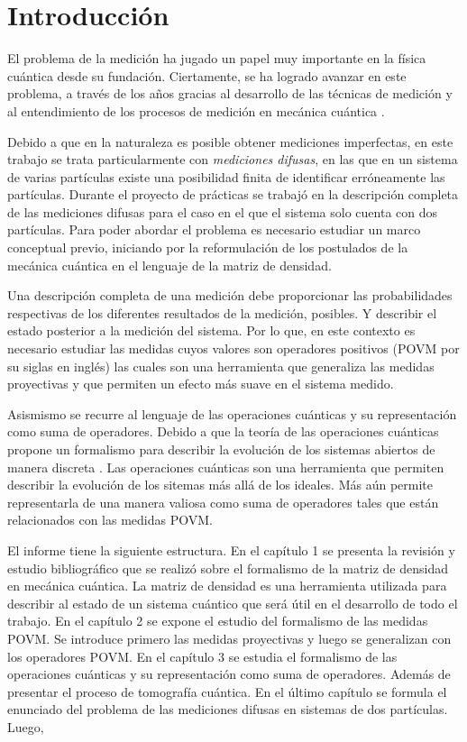 \chapter*{Introducción}

El problema de la medición ha jugado un papel muy importante en la física cuántica desde su fundación. Ciertamente, se ha logrado avanzar en este problema, a través de los años gracias al desarrollo de las técnicas de medición y al entendimiento de los procesos de medición en mecánica cuántica {\cite{Pineda_2021}}. 

Debido a que en la naturaleza es posible obtener  mediciones imperfectas, en este trabajo se trata particularmente con \textit{mediciones difusas}, en las que en un sistema de varias partículas existe una posibilidad finita de identificar erróneamente las partículas. Durante el proyecto de prácticas se trabajó en la descripción completa de las mediciones difusas para el caso en el que el sistema solo cuenta con dos partículas. Para poder abordar el problema es necesario estudiar un marco conceptual previo, iniciando por la reformulación de los postulados de la mecánica cuántica en el lenguaje de la matriz de densidad.

Una descripción completa de una medición debe proporcionar las probabilidades respectivas de los diferentes resultados de la medición, posibles. Y describir el estado posterior a la medición del sistema. Por lo que, en este contexto es necesario estudiar las medidas cuyos valores son operadores positivos (POVM por su siglas en inglés) las cuales son una herramienta que generaliza las medidas proyectivas y que permiten un efecto más suave en el sistema medido.  

Asismismo se recurre al lenguaje de las operaciones cuánticas y su representación como  suma de operadores. Debido a que la teoría de las operaciones cuánticas propone un formalismo para describir la evolución de los sistemas abiertos de manera discreta {\cite{nielsen_chuang_2010}}. Las operaciones cuánticas son una herramienta que permiten describir la evolución de los sitemas más allá de los ideales. Más aún permite representarla de una manera valiosa como suma de operadores tales que están relacionados con las medidas POVM\@.

El informe tiene la siguiente estructura.  En el capítulo 1 se presenta la revisión y estudio bibliográfico que se realizó sobre el formalismo de la matriz de densidad en mecánica cuántica. La matriz de densidad es una herramienta utilizada para describir al estado de un sistema cuántico que será útil en el desarrollo de todo el trabajo. En el capítulo 2 se expone el estudio del formalismo de las medidas POVM\@. Se introduce primero las medidas proyectivas y luego se generalizan con los operadores POVM\@. En el capítulo 3 se estudia el formalismo de las operaciones cuánticas y su representación como suma de operadores. Además de presentar el proceso de tomografía cuántica. En el último capítulo se formula el enunciado del problema de las mediciones difusas en sistemas de dos partículas. Luego,